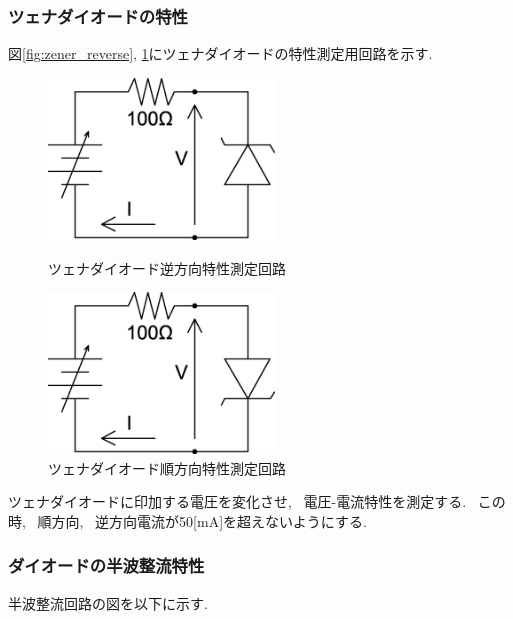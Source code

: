 \documentclass[uplatex,dvipdfmx,a4paper,js=standard, titlepage]{bxjsarticle}
\begin{document}
        \subsubsection{ツェナダイオードの特性}
            図\ref{fig:zener_reverse}, \ref{fig:zener_forward}にツェナダイオードの特性測定用回路を示す.
            \begin{figure}[ht]
                \begin{minipage}{0.5\hsize}
                    \begin{center}
                        \includegraphics[width=6cm]{images/zener_reverse.eps}
                        \caption{ツェナダイオード逆方向特性測定回路}
                        \label{fig:zener_reverse}
                    \end{center}
                \end{minipage}
                \begin{minipage}{0.5\hsize}
                    \begin{center}
                        \includegraphics[width=6cm]{images/zener_forward.eps}
                        \caption{ツェナダイオード順方向特性測定回路}
                        \label{fig:zener_forward}
                    \end{center}
                \end{minipage}
            \end{figure}

            ツェナダイオードに印加する電圧を変化させ, ~電圧-電流特性を測定する.
            ~この時, ~順方向, ~逆方向電流が50[mA]を超えないようにする.
        \subsubsection{ダイオードの半波整流特性}
            半波整流回路の図を以下に示す.
\end{document}
